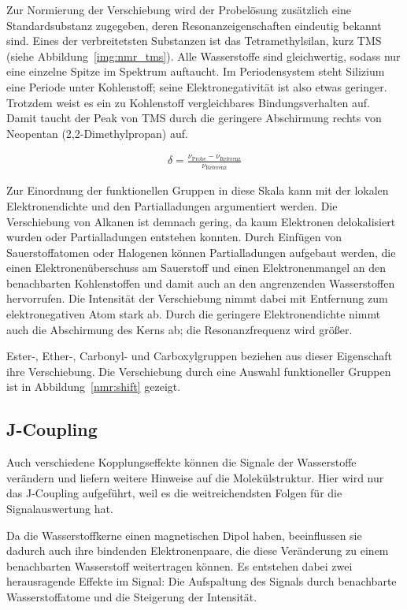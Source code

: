 Zur Normierung der Verschiebung wird der Probelösung zusätzlich eine Standardsubstanz zugegeben, deren Resonanzeigenschaften eindeutig bekannt sind.
Eines der verbreitetsten Substanzen ist das Tetramethylsilan, kurz TMS (siehe Abbildung~\ref{img:nmr_tms}). Alle Wasserstoffe sind gleichwertig, sodass nur eine einzelne Spitze im Spektrum auftaucht. Im Periodensystem steht Silizium eine Periode unter Kohlenstoff; seine Elektronegativität ist also etwas geringer. Trotzdem weist es ein zu Kohlenstoff vergleichbares Bindungsverhalten auf.
Damit taucht der Peak von TMS durch die geringere Abschirmung rechts von Neopentan (2,2-Dimethylpropan) auf.

\begin{align}
  \delta = \frac{\nu_\text{Probe} - \nu_\text{Referenz}}{\nu_\text{Referenz}}
\end{align}

Zur Einordnung der funktionellen Gruppen in diese Skala kann mit der lokalen Elektronendichte und den Partialladungen argumentiert werden. Die Verschiebung von Alkanen ist demnach gering, da kaum Elektronen delokalisiert wurden oder Partialladungen entstehen konnten.
Durch Einfügen von Sauerstoffatomen oder Halogenen können Partialladungen aufgebaut werden, die einen Elektronenüberschuss am Sauerstoff und einen Elektronenmangel an den benachbarten Kohlenstoffen und damit auch an den angrenzenden Wasserstoffen hervorrufen. Die Intensität der Verschiebung nimmt dabei mit Entfernung zum elektronegativen Atom stark ab. Durch die geringere Elektronendichte nimmt auch die Abschirmung des Kerns ab; die Resonanzfrequenz wird grö\ss{}er.

Ester-, Ether-, Carbonyl- und Carboxylgruppen beziehen aus dieser Eigenschaft ihre Verschiebung. Die Verschiebung durch eine Auswahl funktioneller Gruppen ist in Abbildung~\ref{nmr:shift} gezeigt.

\subsection{J-Coupling}
\label{nmr:jcoup}

Auch verschiedene Kopplungseffekte können die Signale der Wasserstoffe verändern und liefern weitere Hinweise auf die Molekülstruktur. Hier wird nur das J-Coupling aufgeführt, weil es die weitreichendsten Folgen für die Signalauswertung hat.

Da die Wasserstoffkerne einen magnetischen Dipol haben, beeinflussen sie dadurch auch ihre bindenden Elektronenpaare, die diese Veränderung zu einem benachbarten Wasserstoff weitertragen können. Es entstehen dabei zwei herausragende Effekte im Signal: Die Aufspaltung des Signals durch benachbarte Wasserstoffatome und die Steigerung der Intensität.

